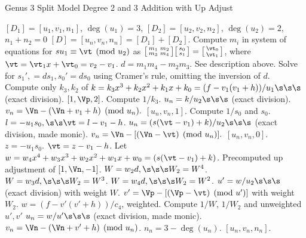 \begin{algorithm}[htbp]
\caption{Genus 3 Split Model Degree 2 and 3 Addition with Up Adjust\label{alg:g3explSPLIT23ADDUP}}
\begin{algorithmic} [1]
\Require $[D_1] = [u_1,v_1,n_1]$, $\deg(u_1) = 3$, $[D_2] = [u_2,v_2,n_2]$, $\deg(u_2) = 2$, $n_1 + n_2 = 0$
\Ensure $[D] = [u_n,v_n,n_n] = [D_1] + [D_2] $.
\algrule
\vspace{-2pt}
\State Compute $m_i$ in system of equations for $su_1\equiv \vt \pmod{u_2}$ as $ \bigl[ \begin{smallmatrix} m_1 & m_2\\ m_3 & m_4\end{smallmatrix}\bigr] \bigl[ \begin{smallmatrix} s_0\\ s_1 \end{smallmatrix} \bigr ] = \bigl[ \begin{smallmatrix}\vt_0 \\  \vt_1\end{smallmatrix} \bigr ]$, where $\vt = \vt_1x + \vt_0 = v_2 - v_1$.
\State $d = m_1m_4 - m_2m_3$.
    \State See description above.
\EndIf
\State Solve for $s_1', = ds_1, s_0' = ds_0$ using Cramer's rule, omitting the inversion of $d$.
\State Compute only $k_3, k_2$ of $k = k_3x^3 + k_2x^2 + k_1x + k_0 = (f - v_1(v_1 + h))/u_1 \s\s\s$ (exact division).  
         \Return $[1,\Vp,2]$.
        \Else \hspace{3pt} Compute $1/k_3$.
            \State $u_n = k/u_2 \s\s\s$ (exact division).
            \State $v_n = \Vn - (\Vn + v_1 + h) \pmod{u_n}.$
            \State \Return $[u_n,v_n,1]$.
        \EndIf
    \Else \hspace{3pt} Compute $1/s_0$ and $s_0$.
        \State $l = -u_1s_0, \s\s \vt = l - v_1 - h$.
        \State $u_n = (s(\vt - v_1) + k)/u_2 \s\s\s$ (exact division, made monic).
        \State $v_n = \Vn - [(\Vn - \vt) \pmod{u_n}].$
        \State \Return $[u_n,v_n,0]$.
    \EndIf
\EndIf
\State $z = -u_1s_0$.
\State $\vt = z - v_1 - h$.
\State Let $w = w_4x^4 + w_3x^3 + w_2x^2 + w_1x + w_0 = (s(\vt - v_1) + k)$.
         \Return Precomputed up adjustment of $[1,\Vn,-1]$.
        \Else \hspace{3pt} $W = w_2d, \s\s\s W_2 = W^4$.
        \EndIf
    \Else \hspace{3pt} $W = w_3d, \s\s\s W_2 = W^3$.
    \EndIf
\Else \hspace{3pt} $W = w_4d, \s\s\s W_2 = W^2$.
\EndIf
\State $u' = w/u_2 \s\s\s$ (exact division) with weight $W$.
\State $v' = \Vp - [(\Vp - \vt) \pmod{u'}]$  with weight $W_2$.
\State $w = (f - v'(v' + h))/c_4$, weighted.
\State Compute $1/W$, $1/W_2$ and unweighted $u',v'$
\State $u_n = w/u' \s\s\s$ (exact division, made monic).
\State $v_n = \Vn - (\Vn + v' + h) \pmod{u_n}$.
\State $n_n = 3 - \deg(u_n)$.
\State \Return $[u_n, v_n,n_n]$.
\vspace{-2pt}
\end{algorithmic}
\end{algorithm}

